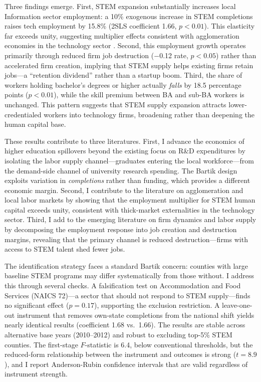 \documentclass[12pt]{article}
\begin{document}
Three findings emerge. First, STEM expansion substantially increases local Information sector employment: a 10\% exogenous increase in STEM completions raises tech employment by 15.8\% (2SLS coefficient 1.66, $p<0.01$). This elasticity far exceeds unity, suggesting multiplier effects consistent with agglomeration economies in the technology sector \citep{moretti2010local, moretti2019effect}. Second, this employment growth operates primarily through reduced firm job destruction ($-$0.12 rate, $p<0.05$) rather than accelerated firm creation, implying that STEM supply helps existing firms retain jobs---a ``retention dividend'' rather than a startup boom. Third, the share of workers holding bachelor's degrees or higher actually \textit{falls} by 18.5 percentage points ($p<0.01$), while the skill premium between BA and sub-BA workers is unchanged. This pattern suggests that STEM supply expansion attracts lower-credentialed workers into technology firms, broadening rather than deepening the human capital base.

These results contribute to three literatures. First, I advance the economics of higher education spillovers beyond the existing focus on R\&D expenditures \citep{hausman2022university, kantor2019agglomeration, valero2019higher} by isolating the labor supply channel---graduates entering the local workforce---from the demand-side channel of university research spending. The Bartik design exploits variation in \textit{completions} rather than funding, which provides a different economic margin. Second, I contribute to the literature on agglomeration and local labor markets \citep{greenstone2010identifying, kline2014people, glaeser2014housing} by showing that the employment multiplier for STEM human capital exceeds unity, consistent with thick-market externalities in the technology sector. Third, I add to the emerging literature on firm dynamics and labor supply \citep{decker2014role, haltiwanger2013creates} by decomposing the employment response into job creation and destruction margins, revealing that the primary channel is reduced destruction---firms with access to STEM talent shed fewer jobs.

The identification strategy faces a standard Bartik concern: counties with large baseline STEM programs may differ systematically from those without. I address this through several checks. A falsification test on Accommodation and Food Services (NAICS 72)---a sector that should not respond to STEM supply---finds no significant effect ($p=0.17$), supporting the exclusion restriction. A leave-one-out instrument that removes own-state completions from the national shift yields nearly identical results (coefficient 1.68 vs.\ 1.66). The results are stable across alternative base years (2010--2012) and robust to excluding top-5\% STEM counties. The first-stage $F$-statistic is 6.4, below conventional thresholds, but the reduced-form relationship between the instrument and outcomes is strong ($t=8.9$), and I report Anderson-Rubin confidence intervals that are valid regardless of instrument strength.
\end{document}
